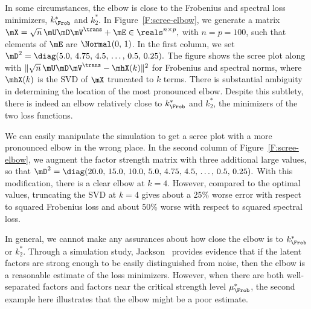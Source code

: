 In some circumstances, the elbow is close to the Frobenius and spectral loss
minimizers, $k_\Frob^\ast$ and $k_2^\ast$. In Figure~\ref{F:scree-elbow}, we
generate a matrix
\(
    \mX = \sqrt{n} \, \mU \mD \mV^\trans + \mE \in \reals^{n \times p},
\)
with $n = p = 100$, such that elements of $\mE$ are \iid $\Normal( 0, \, 1)$.
In the first column, we set
\(
    \mD^2 = \diag( 5.0, \, 4.75, \, 4.5, \, \ldots, \, 0.5, \, 0.25 ).
\)
The figure shows the scree plot along with
\(
    \| \sqrt{n} \, \mU \mD \mV^\trans - \mhX(k) \|^2
\)
for Frobenius and spectral norms, where $\mhX(k)$ is the SVD of $\mX$
truncated to $k$ terms. There is substantial ambiguity in determining the
location of the most pronounced elbow. Despite this subtlety, there is indeed
an elbow relatively close to $k_\Frob^\ast$ and $k_2^\ast$, the minimizers of
the two loss functions.

We can easily manipulate the simulation to get a scree plot with a more
pronounced elbow in the wrong place.  In the second column of Figure~\ref{F:scree-elbow}, we augment the factor strength matrix with three additional large values, so that
\(
    \mD^2
    =
    \diag(
        20.0, \, 15.0, \, 10.0, \,
        5.0, \, 4.75, \, 4.5, \, \ldots, \, 0.5, \, 0.25
    ).
\)
With this modification, there is a clear elbow at $k=4$.  However, compared to
the optimal values, truncating the SVD at $k=4$ gives about a 25\% worse error
with respect to squared Frobenius loss and about 50\% worse with respect to
squared spectral loss.

In general, we cannot make any assurances about how close the elbow is to
$k_\Frob^\ast$ or $k_2^\ast$.  Through a simulation study,
Jackson~\cite{jackson1993stopping} provides evidence that if the latent
factors are strong enough to be easily distinguished from noise, then the
elbow is a reasonable estimate of the loss minimizers.  However, when there
are both well-separated factors and factors near the critical strength level
$\mu_\Frob^\ast$, the second example here illustrates that the elbow might be
a poor estimate.

